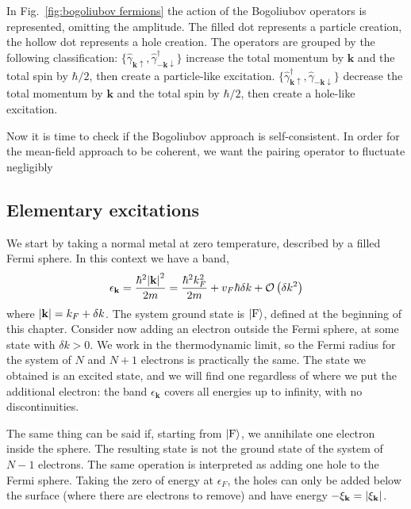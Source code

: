 In Fig.~\ref{fig:bogoliubov fermions} the action of the Bogoliubov operators is represented, omitting the amplitude. The filled dot represents a particle creation, the hollow dot represents a hole creation. The operators are grouped by the following classification: $\lbrace \hat{\gamma}_{\mathbf{k}\uparrow}, \hat{\gamma}_{-\mathbf{k}\downarrow}^\dagger \rbrace$ increase the total momentum by $\mathbf{k}$ and the total spin by $\hbar/2$, then create a particle-like excitation. $\lbrace \hat{\gamma}_{\mathbf{k}\uparrow}^\dagger, \hat{\gamma}_{-\mathbf{k}\downarrow} \rbrace$ decrease the total momentum by $\mathbf{k}$ and the total spin by $\hbar/2$, then create a hole-like excitation. 

Now it is time to check if the Bogoliubov approach is self-consistent. In order for the mean-field approach to be coherent, we want the pairing operator to fluctuate negligibly 

\subsection{Elementary excitations}

We start by taking a normal metal at zero temperature, described by a filled Fermi sphere. In this context we have a band,
\[
	\epsilon_\mathbf{k} = \frac{\hbar^2 \abs{\mathbf{k}}^2}{2m} = \frac{\hbar^2 k_F^2}{2m} + v_F \hbar\delta k + \mathcal{O}\left({\delta k^2}\right)
\]
where $\abs{\mathbf{k}} = k_F + \delta k$. The system ground state is $\ket{\mathrm{F}}$, defined at the beginning of this chapter. Consider now adding an electron outside the Fermi sphere, at some state with $\delta k > 0$. We work in the thermodynamic limit, so the Fermi radius for the system of $N$ and $N+1$ electrons is practically the same. The state we obtained is an excited state, and we will find one regardless of where we put the additional electron: the band $\epsilon_\mathbf{k}$ covers all energies up to infinity, with no discontinuities.

The same thing can be said if, starting from $\ket{\mathrm{F}}$, we annihilate one electron inside the sphere. The resulting state is not the ground state of the system of $N-1$ electrons. The same operation is interpreted as adding one hole to the Fermi sphere. Taking the zero of energy at $\epsilon_F$, the holes can only be added below the surface (where there are electrons to remove) and have energy $-\xi_\mathbf{k} = \abs{\xi_\mathbf{k}}$.

